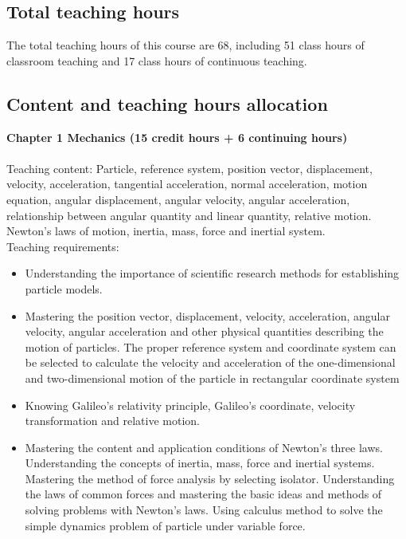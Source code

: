 \documentclass[10pt,a4paper,oneside]{article}
\begin{document}
\subsection{Total teaching hours}
The total teaching hours of this course are 68, including 51 class hours of classroom teaching and 17 class hours of continuous teaching.
\subsection{Content and teaching hours allocation}
{\bfseries Chapter 1 Mechanics (15 credit hours + 6 continuing hours)}\\

\\

Teaching content: Particle, reference system, position vector, displacement, velocity, acceleration, tangential acceleration, normal acceleration, motion equation, angular displacement, angular velocity, angular acceleration, relationship between angular quantity and linear quantity, relative motion. Newton's laws of motion, inertia, mass, force and inertial system.\\

Teaching requirements:
\begin{itemize}
\item Understanding the importance of scientific research methods for establishing particle models.
\item Mastering the position vector, displacement, velocity, acceleration, angular velocity, angular acceleration and other physical quantities describing the motion of particles. The proper reference system and coordinate system can be selected to calculate the velocity and acceleration of the one-dimensional and two-dimensional motion of the particle in rectangular coordinate system
\item  Knowing Galileo's relativity principle, Galileo's coordinate, velocity transformation and relative motion.
\item Mastering the content and application conditions of Newton's three laws. Understanding the concepts of inertia, mass, force and inertial systems. Mastering the method of force analysis by selecting isolator. Understanding the laws of common forces and mastering the basic ideas and methods of solving problems with Newton's laws. Using calculus method to solve the simple dynamics problem of particle under variable force.
\end{itemize}
\\
\end{document}
